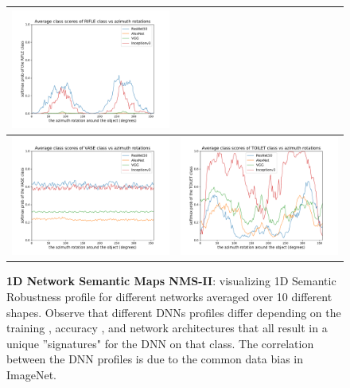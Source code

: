 \begin{figure}[h]
\begin{tabular}{c|c}
\includegraphics[width = 9cm]{supimages/nms1d/average_azimuth_performance_RIFLE.pdf}\\\hline
\includegraphics[width = 9cm]{supimages/nms1d/average_azimuth_performance_VASE.pdf}&
\includegraphics[width = 9cm]{supimages/nms1d/average_azimuth_performance_TOILET.pdf}
\end{tabular}
   \caption{\small \textbf{1D Network Semantic Maps NMS-II}: visualizing 1D Semantic Robustness profile for different networks averaged over 10 different shapes. Observe that different DNNs profiles differ depending on the training , accuracy , and network architectures that all result in a unique ''signatures" for the DNN on that class. The correlation between the DNN profiles is due to the common data bias in ImageNet.}
   \vspace{-8pt}
   \label{fig:nsm1d-2}
\end{figure}

